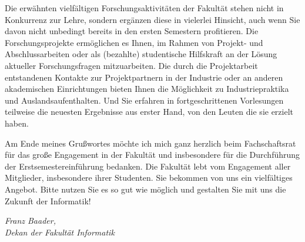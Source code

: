 Die erwähnten vielfältigen Forschungsaktivitäten der Fakultät stehen nicht in Konkurrenz zur Lehre, sondern ergänzen diese in vielerlei Hinsicht, auch wenn Sie davon nicht unbedingt bereits in den ersten Semestern profitieren. Die Forschungsprojekte ermöglichen es Ihnen, im Rahmen von Projekt- und Abschlussarbeiten oder als (bezahlte) studentische Hilfskraft an der Lösung aktueller Forschungsfragen mitzuarbeiten. Die durch die Projektarbeit entstandenen Kontakte zur Projektpartnern in der Industrie oder an anderen akademischen Einrichtungen bieten Ihnen die Möglichkeit zu Industriepraktika und Auslandsaufenthalten. Und Sie erfahren in fortgeschrittenen Vorlesungen teilweise die neuesten Ergebnisse aus erster Hand, von den Leuten die sie erzielt haben.

Am Ende meines Grußwortes möchte ich mich ganz herzlich beim Fachschaftsrat für das große Engagement in der Fakultät und insbesondere für die Durchführung der Erstsemestereinführung bedanken. Die Fakultät lebt vom Engagement aller Mitglieder, insbesondere ihrer Studenten. Sie bekommen von uns ein vielfältiges Angebot. Bitte nutzen Sie es so gut wie möglich und gestalten Sie mit uns die Zukunft der Informatik!

\textit{Franz Baader,\\
Dekan der Fakultät Informatik}
